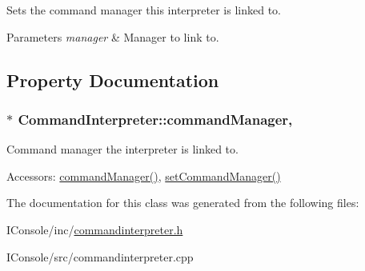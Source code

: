 Sets the command manager this interpreter is linked to. 


\begin{DoxyParams}{Parameters}
{\em manager} & Manager to link to. \\
\hline
\end{DoxyParams}


\subsection{Property Documentation}
\hypertarget{class_command_interpreter_a18830cc24516b4ef3f16146996fbc93b}{
\subsubsection[{command\-Manager}]{ $\ast$ Command\-Interpreter\-::command\-Manager\hspace{0.3cm}{\ttfamily [read]}, {\ttfamily [write]}}}\label{class_command_interpreter_a18830cc24516b4ef3f16146996fbc93b}


Command manager the interpreter is linked to. 

\begin{DoxyParagraph}{Accessors\-:}
\hyperlink{class_command_interpreter_a18830cc24516b4ef3f16146996fbc93b}{command\-Manager()}, \hyperlink{class_command_interpreter_ab09208de80f1c7d13774905df9b6443a}{set\-Command\-Manager()} 
\end{DoxyParagraph}


The documentation for this class was generated from the following files\-:\begin{DoxyCompactItemize}
\item 
I\-Console/inc/\hyperlink{commandinterpreter_8h}{commandinterpreter.\-h}\item 
I\-Console/src/commandinterpreter.\-cpp\end{DoxyCompactItemize}
